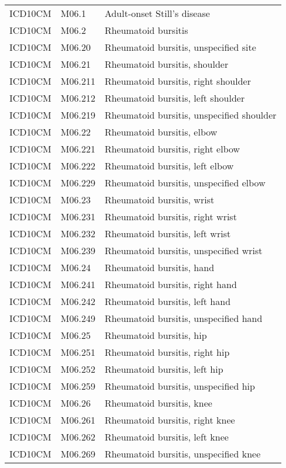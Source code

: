 \begin{table}[ht]
\begin{tabular}{lll}
  ICD10CM & M06.1 & Adult-onset Still's disease \\ 
  ICD10CM & M06.2 & Rheumatoid bursitis \\ 
  ICD10CM & M06.20 & Rheumatoid bursitis, unspecified site \\ 
  ICD10CM & M06.21 & Rheumatoid bursitis, shoulder \\ 
  ICD10CM & M06.211 & Rheumatoid bursitis, right shoulder \\ 
  ICD10CM & M06.212 & Rheumatoid bursitis, left shoulder \\ 
  ICD10CM & M06.219 & Rheumatoid bursitis, unspecified shoulder \\ 
  ICD10CM & M06.22 & Rheumatoid bursitis, elbow \\ 
  ICD10CM & M06.221 & Rheumatoid bursitis, right elbow \\ 
  ICD10CM & M06.222 & Rheumatoid bursitis, left elbow \\ 
  ICD10CM & M06.229 & Rheumatoid bursitis, unspecified elbow \\ 
  ICD10CM & M06.23 & Rheumatoid bursitis, wrist \\ 
  ICD10CM & M06.231 & Rheumatoid bursitis, right wrist \\ 
  ICD10CM & M06.232 & Rheumatoid bursitis, left wrist \\ 
  ICD10CM & M06.239 & Rheumatoid bursitis, unspecified wrist \\ 
  ICD10CM & M06.24 & Rheumatoid bursitis, hand \\ 
  ICD10CM & M06.241 & Rheumatoid bursitis, right hand \\ 
  ICD10CM & M06.242 & Rheumatoid bursitis, left hand \\ 
  ICD10CM & M06.249 & Rheumatoid bursitis, unspecified hand \\ 
  ICD10CM & M06.25 & Rheumatoid bursitis, hip \\ 
  ICD10CM & M06.251 & Rheumatoid bursitis, right hip \\ 
  ICD10CM & M06.252 & Rheumatoid bursitis, left hip \\ 
  ICD10CM & M06.259 & Rheumatoid bursitis, unspecified hip \\ 
  ICD10CM & M06.26 & Rheumatoid bursitis, knee \\ 
  ICD10CM & M06.261 & Rheumatoid bursitis, right knee \\ 
  ICD10CM & M06.262 & Rheumatoid bursitis, left knee \\ 
  ICD10CM & M06.269 & Rheumatoid bursitis, unspecified knee \\ 

\end{tabular}
\end{table}
